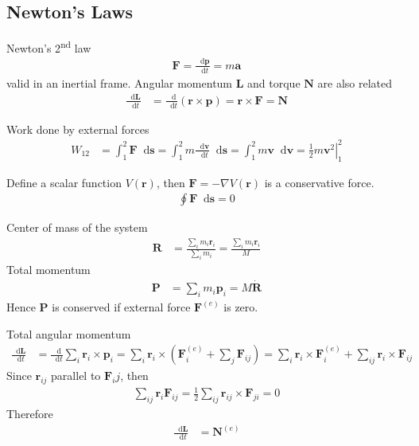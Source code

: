 \documentclass[twoside,11pt]{article}
\renewcommand*\d{\mathop{}\!\mathrm{d}}
\theoremstyle{definition}
\theoremstyle{remark}
\begin{document}
\subsection{Newton's Laws}
Newton's 2\textsuperscript{nd} law
\begin{align}
    \mathbf{F} = \frac{\d \mathbf{p}}{\d t} = m\mathbf{a}
\end{align}
valid in an inertial frame.
Angular momentum $\mathbf{L}$ and torque $\mathbf{N}$ are also related
\begin{align}
    \frac{\d\mathbf{L}}{\d t} &= 
    \frac{\d}{\d t}(\mathbf{r}\times\mathbf{p})
    = \mathbf{r}\times\mathbf{F}
    = \mathbf{N}
\end{align}

Work done by external forces
\begin{align}
    W_{12} &= \int_1^2\mathbf{F}\d\mathbf{s}
    = \int_1^2 m\frac{\d\mathbf{v}}{\d t}\d\mathbf{s}
    = \int_1^2 m\mathbf{v}\d\mathbf{v}
    = \left.\frac{1}{2}m\mathbf{v}^2\right|_1^2
\end{align}

Define a scalar function $V(\mathbf{r})$,
then $\mathbf{F}=-\nabla V(\mathbf{r})$ is a conservative force.
\begin{align}
    \oint \mathbf{F}\d\mathbf{s} = 0
\end{align}

Center of mass of the system
\begin{align}
    \mathbf{R} &= 
    \frac{\sum_i m_i\mathbf{r}_i}{\sum_i m_i}
    =
    \frac{\sum_i m_i\mathbf{r}_i}{M}
\end{align}
Total momentum
\begin{align}
    \mathbf{P} 
    &= 
    \sum_i m_i\mathbf{p}_i
    = M\dot{\mathbf{R}}
\end{align}
Hence $\mathbf{P}$ is conserved if external force $\mathbf{F}^{(e)}$ is
zero.

Total angular momentum
\begin{align*}
    \frac{\d \mathbf{L}}{\d t} &= 
    \frac{\d }{\d t} \sum_i\mathbf{r}_i\times\mathbf{p}_i
    = \sum_i \mathbf{r}_i\times \left(
        \mathbf{F}_i^{(e)} + \sum_j \mathbf{F}_{ij}
    \right)
    = \sum_i\mathbf{r}_i\times\mathbf{F}_i^{(e)}
    + \sum_{ij}\mathbf{r}_i\times\mathbf{F}_{ij}
\end{align*}
Since $\mathbf{r}_{ij}$ parallel to $\mathbf{F}_ij$, then
\begin{align}
    \sum_{ij}\mathbf{r}_i\mathbf{F}_{ij} = 
    \frac{1}{2}\sum_{ij}\mathbf{r}_{ij}\times\mathbf{F}_{ji} = 0
\end{align}
Therefore
\begin{align}
    \frac{\d\mathbf{L}}{\d t} &= \mathbf{N}^{(e)}
\end{align}
\end{document}
